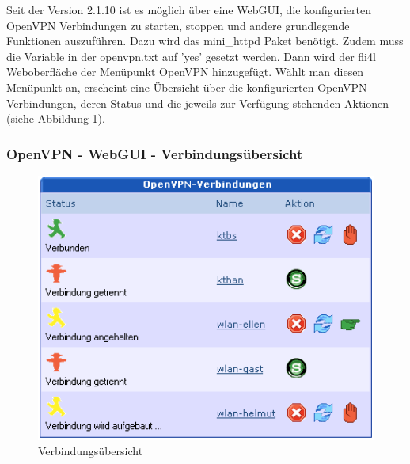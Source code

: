 
Seit der Version 2.1.10 ist es möglich über eine WebGUI, die
konfigurierten OpenVPN Verbindungen zu starten, stoppen und andere
grundlegende Funktionen auszuführen. Dazu wird das mini\_httpd Paket
benötigt. Zudem muss die Variable  in der openvpn.txt
auf 'yes' gesetzt werden.  Dann wird der fli4l Weboberfläche der
Menüpunkt OpenVPN hinzugefügt.  Wählt man diesen Menüpunkt an,
erscheint eine Übersicht über die konfigurierten OpenVPN Verbindungen,
deren Status und die jeweils zur Verfügung stehenden Aktionen (siehe
Abbildung \ref{fig:guiact}).

\subsubsection{OpenVPN - WebGUI - Verbindungsübersicht}
  \begin{figure}[!h]
    \centering
    \includegraphics[width=400pt]{verbindungen}
    \caption{Verbindungsübersicht}
    \label{fig:guiact}
  \end{figure}


